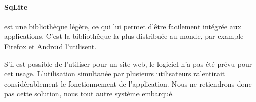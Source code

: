 \paragraph*{SqLite} est une bibliothèque légère, ce qui lui permet d'être facilement intégrée aux applications. C'est la bibliothèque la plus distribuée au monde, par example Firefox et Androïd l'utilisent. 


S'il est possible de l'utiliser pour un site web, le logiciel n'a pas été prévu pour cet usage. L'utilisation simultanée par plusieurs utilisateurs ralentirait considérablement le fonctionnement de l'application. Nous ne retiendrons donc pas cette solution, nous tout autre système embarqué. 


 



